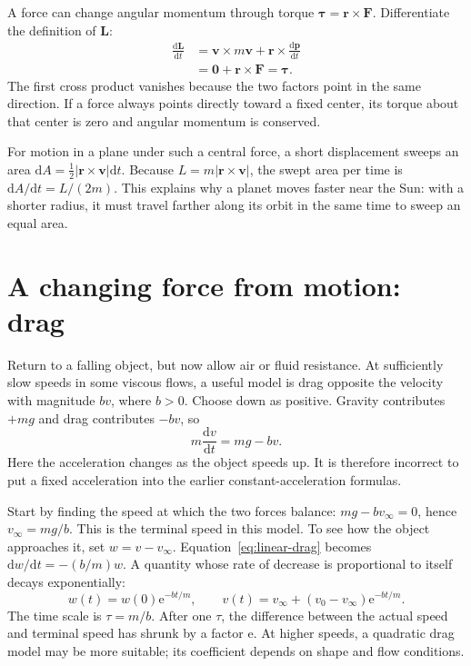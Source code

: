 \documentclass[11pt,oneside]{book}
\newcommand{\dd}{\mathrm{d}}
\newcommand{\ee}{\mathrm{e}}
\newcommand{\vect}[1]{\boldsymbol{#1}}
\newcommand{\od}[2]{\frac{\dd #1}{\dd #2}}
\theoremstyle{reviewstyle}
\begin{document}
A force can change angular momentum through torque $\vect\tau=\vect r\times\vect F$. Differentiate the definition of $\vect L$:
\begin{align}
\od{\vect L}{t}
&=\vect v\times m\vect v+\vect r\times\od{\vect p}{t}\\
&=\vect 0+\vect r\times\vect F=\vect\tau.
\end{align}
The first cross product vanishes because the two factors point in the same direction. If a force always points directly toward a fixed center, its torque about that center is zero and angular momentum is conserved.

For motion in a plane under such a central force, a short displacement sweeps an area $\dd A=\tfrac12|\vect r\times\vect v|\dd t$. Because $L=m|\vect r\times\vect v|$, the swept area per time is $\dd A/\dd t=L/(2m)$. This explains why a planet moves faster near the Sun: with a shorter radius, it must travel farther along its orbit in the same time to sweep an equal area.

\section{A changing force from motion: drag}
Return to a falling object, but now allow air or fluid resistance. At sufficiently slow speeds in some viscous flows, a useful model is drag opposite the velocity with magnitude $bv$, where $b>0$. Choose down as positive. Gravity contributes $+mg$ and drag contributes $-bv$, so
\begin{equation}
m\od{v}{t}=mg-bv.
\label{eq:linear-drag}
\end{equation}
Here the acceleration changes as the object speeds up. It is therefore incorrect to put a fixed acceleration into the earlier constant-acceleration formulas.

Start by finding the speed at which the two forces balance: $mg-bv_\infty=0$, hence $v_\infty=mg/b$. This is the terminal speed in this model. To see how the object approaches it, set $w=v-v_\infty$. Equation~\eqref{eq:linear-drag} becomes $\dd w/\dd t=-(b/m)w$. A quantity whose rate of decrease is proportional to itself decays exponentially:
\begin{equation}
w(t)=w(0)\ee^{-bt/m},\qquad
v(t)=v_\infty+(v_0-v_\infty)\ee^{-bt/m}.
\end{equation}
The time scale is $\tau=m/b$. After one $\tau$, the difference between the actual speed and terminal speed has shrunk by a factor $\ee$. At higher speeds, a quadratic drag model may be more suitable; its coefficient depends on shape and flow conditions.
\end{document}
